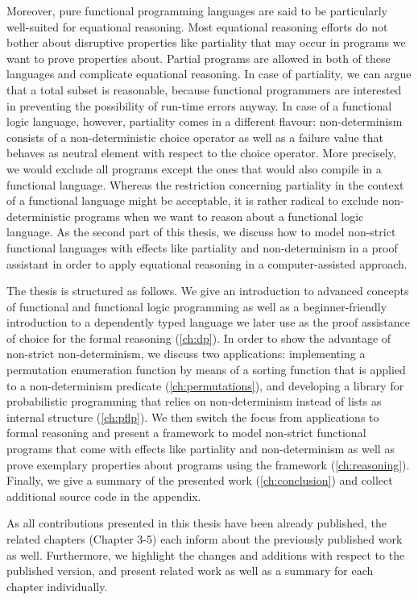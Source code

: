 Moreover, pure functional programming languages are said to be particularly well-suited for equational reasoning.
Most equational reasoning efforts do not bother about disruptive properties like partiality that may occur in programs we want to prove properties about.
Partial programs are allowed in both of these languages and complicate equational reasoning.
In case of partiality, we can argue that a total subset is reasonable, because functional programmers are interested in preventing the possibility of run-time errors anyway.
In case of a functional logic language, however, partiality comes in a different flavour: non-determinism consists of a non-deterministic choice operator as well as a failure value that behaves as neutral element with respect to the choice operator.
More precisely, we would exclude all programs except the ones that would also compile in a functional language.
Whereas the restriction concerning partiality in the context of a functional language might be acceptable, it is rather radical to exclude non-deterministic programs when we want to reason about a functional logic language.
As the second part of this thesis, we discuss how to model non-strict functional languages with effects like partiality and non-determinism in a proof assistant in order to apply equational reasoning in a computer-assisted approach.

The thesis is structured as follows. We give an introduction to advanced concepts of functional and functional logic programming as well as a beginner-friendly introduction to a dependently typed language we later use as the proof assistance of choice for the formal reasoning (\autoref{ch:dp}).
In order to show the advantage of non-strict non-determinism, we discuss two applications: implementing a permutation enumeration function by means of a sorting function that is applied to a non-determinism predicate (\autoref{ch:permutations}), and developing a library for probabilistic programming that relies on non-determinism instead of lists as internal structure (\autoref{ch:pflp}).
We then switch the focus from applications to formal reasoning and present a framework to model non-strict functional programs that come with effects like partiality and non-determinism as well as prove exemplary properties about programs using the framework (\autoref{ch:reasoning}).
Finally, we give a summary of the presented work (\autoref{ch:conclusion}) and collect additional source code in the appendix.

As all contributions presented in this thesis have been already published, the related chapters (Chapter 3-5) each inform about the previously published work as well.
Furthermore, we highlight the changes and additions with respect to the published version, and present related work as well as a summary for each chapter individually.